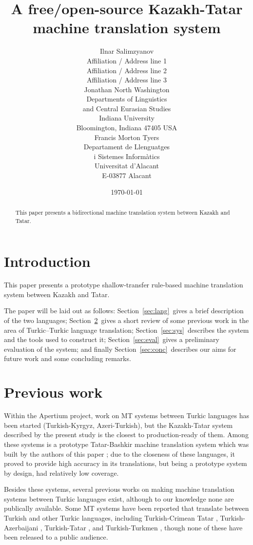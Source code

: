 \documentclass[11pt]{article}
\title{A free/open-source Kazakh-Tatar machine translation system}
\author{Ilnar Salimzyanov\\
  Affiliation / Address line 1\\
  Affiliation / Address line 2\\
  Affiliation / Address line 3\\
  \email{email@domain}  \And
  Jonathan North Washington\\
  Departments of Linguistics\\
  and Central Eurasian Studies\\
  Indiana University\\
  Bloomington, Indiana 47405 USA\\
  \email{jonwashi@indiana.edu}  \And
  Francis Morton Tyers\\
  Departament de Llenguatges\\
  i Sistemes Informàtics\\
  Universitat d'Alacant\\
  E-03877 Alacant\\
  \email{ftyers@dlsi.ua.es}}
\date{\today}
\begin{document}
\maketitle
\begin{abstract}
This paper presents a bidirectional machine translation system between Kazakh and Tatar.
\end{abstract}

\section{Introduction}

This paper presents a prototype shallow-transfer rule-based machine translation
system between Kazakh and Tatar.

The paper will be laid out as follows: Section~\ref{sec:lang}\ gives a brief
description of the two languages; Section~\ref{sec:prev}\ gives a short review
of some previous work in the area of Turkic--Turkic language translation;
Section~\ref{sec:sys}\ describes the system and the tools used to construct it;
Section~\ref{sec:eval}\ gives a preliminary evaluation of the system; and
finally Section~\ref{sec:conc}\ describes our aims for future work and some
concluding remarks.

\section{Previous work}
\label{sec:prev}

Within the Apertium project, work on MT systems between Turkic languages has been started (Turkish-Kyrgyz, Azeri-Turkish), but the Kazakh-Tatar system described by the present study is the closest to production-ready of them.  Among these systems is a prototype Tatar-Bashkir machine translation system which was built by the authors of this paper \citep{tyerswashingtonsalimzyanbattalov12}; due to the closeness of these languages, it proved to provide high accuracy in its translations, but being a prototype system by design, had relatively low coverage.

Besides these systems, several previous works on making machine translation systems between Turkic languages exist, although to our knowledge none are publically available.
Some MT systems have been reported that translate between Turkish and other Turkic languages, including Turkish-Crimean Tatar \citep{altintas01},
Turkish-Azerbaijani \citep{hamzaoglu93}, Turkish-Tatar \citep{suleymanov08}, and
Turkish-Turkmen \citep{tantug07}, though none of these have been released to a public audience.
\end{document}
